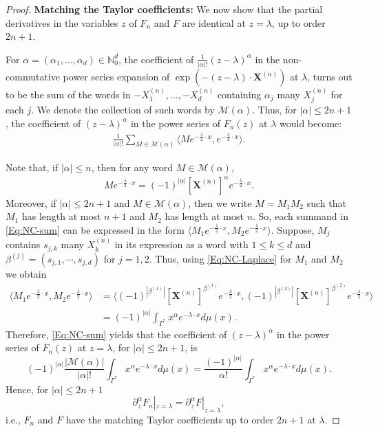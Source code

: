 \documentclass[11pt,reqno]{amsart}
\theoremstyle{plain}
\theoremstyle{definition}
\numberwithin{equation}{section}
\begin{document}
\begin{proof}
\vspace{2mm}

  \noindent \textbf{Matching  the Taylor coefficients:} We now show that the partial derivatives in the variables $z$ of $F_n$ and $F$ are identical at $z = \lambda$, up to order $2n+1$.
    
For $\alpha=(\alpha_1, \dots, \alpha_d) \in \mathbb{N}_0^d$, the coefficient of $\frac{1}{|\alpha|!}(z-\lambda)^\alpha$ in the non-commutative power series expansion of $\exp (- (z- \lambda) \cdot \boldsymbol{X}^{(n)})$ at $\lambda$, turns out to be the sum of the words in $-X^{(n)}_1, \dots,-X^{(n)}_d$ containing $\alpha_j$ many $X^{(n)}_j$ for each $j$. We denote the collection of such words by $\mathcal{M}(\alpha)$.
Thus, for $|\alpha| \leq 2n+1$, the coefficient of $(z-\lambda)^\alpha$ in the power series of $F_n(z)$ at $\lambda$
would become:
\begin{align}\label{Eq:NC-sum}
\frac{1}{|\alpha|!} \sum_{M \in \mathcal{M}(\alpha)} \langle M e^{-\frac{\lambda}{2} \cdot x}, e^{-\frac{\lambda}{2} \cdot x} \rangle.
\end{align}

Note that, if $|\alpha| \leq n$, then for any word $M \in \mathcal{M}(\alpha)$,
\begin{align}\label{Eq:NC-Laplace}
M e^{-\frac{\lambda}{2} \cdot x} = (-1)^{|\alpha|} [\boldsymbol{X}^{(n)}]^\alpha e^{-\frac{\lambda}{2} \cdot x}.
\end{align}
Moreover, if $|\alpha|\leq 2n+1$ and $M\in \mathcal{M}(\alpha)$, then we write $M=M_1M_2$ such that $M_1$ has length at most $n+1$ and $M_2$ has length at most $n$. So, each summand in \eqref{Eq:NC-sum} can be expressed in the form $\langle M_1 e^{-\frac{\lambda}{2} \cdot x}, M_2 e^{-\frac{\lambda}{2} \cdot x}\rangle$. Suppose, $M_j$ contains $s_{j, k}$ many $X^{(n)}_k$ in its expression as a word with $1\leq k \leq d$ and $\beta^{(j)} = (s_{j, 1}, \cdots, s_{j, d} )$ for $j=1,2$. Thus, using \eqref{Eq:NC-Laplace} for $M_1$ and $M_2$ we obtain 
\begin{align*}
\langle M_1 e^{-\frac{\lambda}{2} \cdot x}, M_2 e^{-\frac{\lambda}{2} \cdot x}\rangle &= \langle (-1)^{|\beta^{(1)}|} [\boldsymbol{X}^{(n)}]^{\beta^{(1)}} e^{-\frac{\lambda}{2} \cdot x}, (-1)^{|\beta^{(2)}|} [\boldsymbol{X}^{(n)}]^{\beta^{(2)}} e^{-\frac{\lambda}{2} \cdot x}\rangle \\
& =(-1)^{|\alpha|} \int_{\Gamma^*} x^\alpha e^{-\lambda \cdot x} d\mu(x).
\end{align*}
Therefore, \eqref{Eq:NC-sum} yields that the coefficient of $(z-\lambda)^\alpha$ in the power series of $F_n(z)$ at $z=\lambda$, for $|\alpha| \leq 2n+1$, is
$$
(-1)^{|\alpha|} \frac{|\mathcal{M}(\alpha)|}{|\alpha|!}\int_{\Gamma^*} x^\alpha e^{-\lambda \cdot x} d\mu(x) =  \frac{(-1)^{|\alpha|}}{\alpha !} \int_{\Gamma^*} x^\alpha e^{-\lambda \cdot x} d\mu(x).
$$
Hence, for $|\alpha| \leq 2n+1$
$$
\partial^\alpha_ z F_n |_{z=\lambda} = \partial^\alpha_ z F |_{z=\lambda}, 
$$
i.e., $F_n$ and $F$ have the matching Taylor coefficients up to order $2n+1$ at $\lambda$. 


\end{proof}
\end{document}
